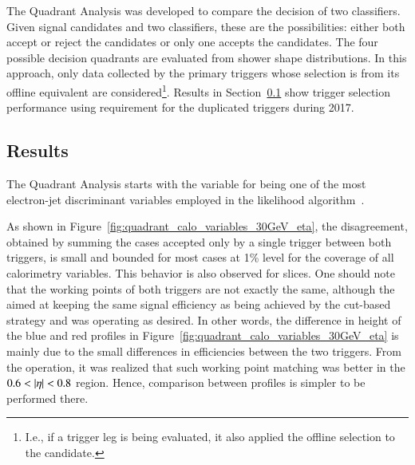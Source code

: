 The Quadrant Analysis was developed to compare the decision of two classifiers. Given signal candidates and two classifiers, these are the possibilities: either both accept or reject the candidates or only one accepts the candidates. The four possible decision quadrants are evaluated from shower shape distributions.
In this approach, only data collected by the primary triggers whose selection is from its offline equivalent are considered\footnote{I.e., if a \tight{} trigger leg is being evaluated, it also applied the \tight{} offline selection to the candidate.}.
Results in Section~\ref{top:quadrant_results} show
trigger selection performance using \tight{} requirement for the duplicated triggers during 2017.

\subsection{Results}\label{top:quadrant_results}



The Quadrant Analysis starts with the variable \reta{} for being one of the
most electron-jet discriminant variables employed in the likelihood
algorithm~\cite{aaboud2019electron}. 



As shown in Figure~\ref{fig:quadrant_calo_variables_30GeV_eta}, the disagreement, obtained by summing the cases accepted only by a single trigger between both triggers, is small and bounded for most cases at 1\% level for the coverage of all calorimetry variables. 
This behavior is also observed for \et{} slices. 
One should note that the working points of both triggers are not  exactly the same, although the \rnn{} aimed at keeping the same signal efficiency as being achieved by the cut-based strategy and was operating as desired.  
In other words, 
the difference in height of the blue and red profiles in Figure~\ref{fig:quadrant_calo_variables_30GeV_eta} is mainly due to the small differences in efficiencies between the two triggers.
From the operation, it was realized that such working point matching was better in the $0.6<\abseta{}<0.8$ region. Hence, comparison between profiles is simpler to be performed there.

